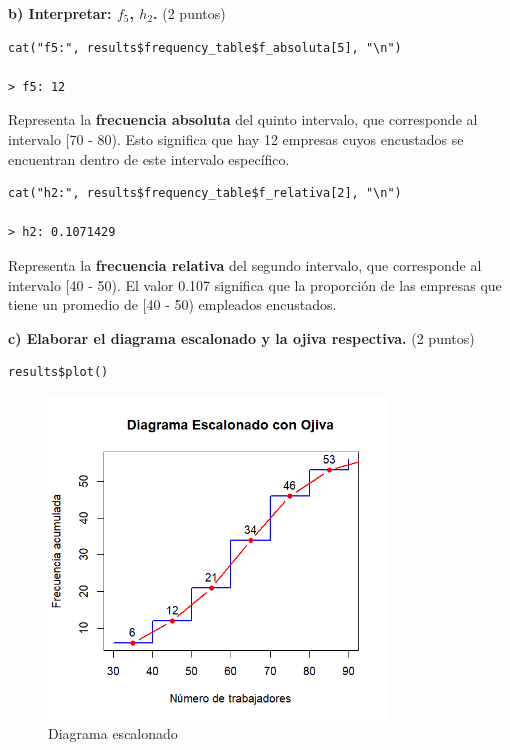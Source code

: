 \documentclass[12pt, a4paper]{article}
\begin{document}
\textbf{b) Interpretar: $f_5$, $h_2$.} (2 puntos)

\begin{lstlisting}[caption=Obtener celdas especificas]
cat("f5:", results$frequency_table$f_absoluta[5], "\n")

> f5: 12

\end{lstlisting}

Representa la \textbf{frecuencia absoluta} del quinto intervalo, que corresponde al intervalo [70 - 80). Esto significa que hay 12 empresas cuyos encustados se encuentran dentro de este intervalo específico.

\begin{lstlisting}[caption=Obtener celdas especificas]
cat("h2:", results$frequency_table$f_relativa[2], "\n")

> h2: 0.1071429 
\end{lstlisting}

Representa la \textbf{frecuencia relativa} del segundo intervalo, que corresponde al intervalo [40 - 50). El valor 0.107 significa que la proporción de las empresas que tiene un promedio de [40 - 50) empleados encustados.

\textbf{c) Elaborar el diagrama escalonado y la ojiva respectiva.} (2 puntos)

\begin{lstlisting}[caption=Mostrar tabla de frecuencia]
results$plot()
\end{lstlisting}

\begin{figure}[ht!]  %
    \centering
    \includegraphics[width=0.8\textwidth]{Diagrama escalonado.png}  %
    \caption{Diagrama escalonado}  %
    \label{fig:ejemplo1}  %
\end{figure}
\end{document}
